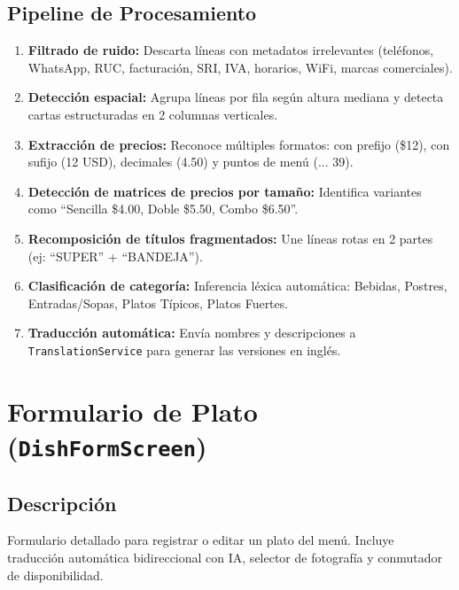 \documentclass[11pt, a4paper, oneside]{report}
\begin{document}
\subsection{Pipeline de Procesamiento}
\begin{enumerate}
  \item \textbf{Filtrado de ruido:} Descarta líneas con metadatos irrelevantes (teléfonos, WhatsApp, RUC, facturación, SRI, IVA, horarios, WiFi, marcas comerciales).
  \item \textbf{Detección espacial:} Agrupa líneas por fila según altura mediana y detecta cartas estructuradas en 2 columnas verticales.
  \item \textbf{Extracción de precios:} Reconoce múltiples formatos: con prefijo (\$12), con sufijo (12 USD), decimales (4.50) y puntos de menú (... 39).
  \item \textbf{Detección de matrices de precios por tamaño:} Identifica variantes como ``Sencilla \$4.00, Doble \$5.50, Combo \$6.50''.
  \item \textbf{Recomposición de títulos fragmentados:} Une líneas rotas en 2 partes (ej: ``SUPER'' + ``BANDEJA'').
  \item \textbf{Clasificación de categoría:} Inferencia léxica automática: Bebidas, Postres, Entradas/Sopas, Platos Típicos, Platos Fuertes.
  \item \textbf{Traducción automática:} Envía nombres y descripciones a \texttt{TranslationService} para generar las versiones en inglés.
\end{enumerate}

\section{Formulario de Plato (\texttt{DishFormScreen})}

\subsection{Descripción}
Formulario detallado para registrar o editar un plato del menú. Incluye traducción automática bidireccional con IA, selector de fotografía y conmutador de disponibilidad.
\end{document}
